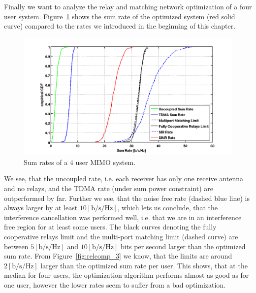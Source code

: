 Finally we want to analyze the relay and matching network optimization of a four user system.
Figure~\ref{fig:4user_sumrate} shows the sum rate of the optimized system (red solid curve) compared to the rates we introduced in the beginning of this chapter.
\begin{figure}[h]
\centering
  \includegraphics[width=\linewidth]{images/4user_sumrate.png}
\caption{Sum rates of a 4 user MIMO system.}
\label{fig:4user_sumrate}
\end{figure}

We see, that the uncoupled rate, i.e. each receiver has only one receive antenna and no relays, and the TDMA rate (under sum power constraint) are outperformed by far.
Further we see, that the noise free rate (dashed blue line) is always larger by  at least  $10 \left[\text{b/s/Hz}\right]$, which lets us conclude, that the interference cancellation was performed well, i.e. that we are in an interference free region for at least some users.
The black curves denoting the fully cooperative relays limit and the multi-port matching limit (dashed curve) are between $5 \left[\text{b/s/Hz}\right]$ and $10 \left[\text{b/s/Hz}\right]$ bits per second larger than the optimized sum rate.
From Figure~\ref{fig:relcomp_3} we know, that the limits are around $2 \left[\text{b/s/Hz}\right]$ larger than the optimized sum rate per user.
This shows, that at the median for four users, the optimization algorithm performs almost as good as for one user, however the lower rates seem to suffer from a bad optimization.

\paragraph{}

